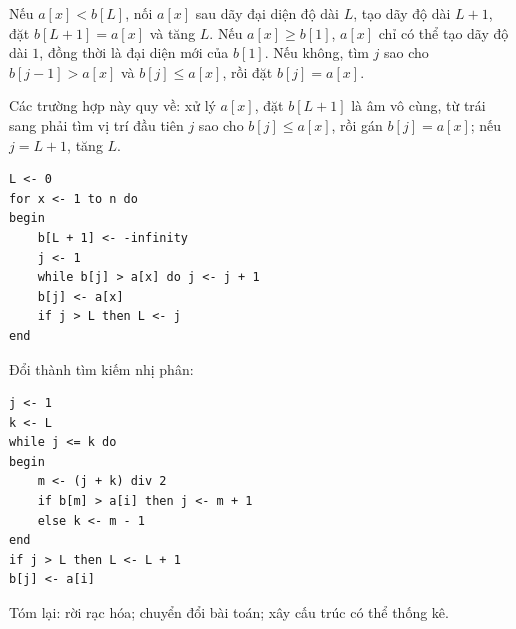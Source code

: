 \documentclass[11pt]{article}
\begin{document}
Nếu \(a[x]<b[L]\), nối \(a[x]\) sau dãy đại diện độ dài \(L\), tạo dãy độ dài
\(L+1\), đặt \(b[L+1]=a[x]\) và tăng \(L\). Nếu \(a[x]\ge b[1]\), \(a[x]\) chỉ
có thể tạo dãy độ dài \(1\), đồng thời là đại diện mới của \(b[1]\). Nếu không,
tìm \(j\) sao cho \(b[j-1]>a[x]\) và \(b[j]\le a[x]\), rồi đặt \(b[j]=a[x]\).

Các trường hợp này quy về: xử lý \(a[x]\), đặt \(b[L+1]\) là âm vô cùng, từ
trái sang phải tìm vị trí đầu tiên \(j\) sao cho \(b[j]\le a[x]\), rồi gán
\(b[j]=a[x]\); nếu \(j=L+1\), tăng \(L\).

\begin{verbatim}
L <- 0
for x <- 1 to n do
begin
    b[L + 1] <- -infinity
    j <- 1
    while b[j] > a[x] do j <- j + 1
    b[j] <- a[x]
    if j > L then L <- j
end
\end{verbatim}

Đổi thành tìm kiếm nhị phân:

\begin{verbatim}
j <- 1
k <- L
while j <= k do
begin
    m <- (j + k) div 2
    if b[m] > a[i] then j <- m + 1
    else k <- m - 1
end
if j > L then L <- L + 1
b[j] <- a[i]
\end{verbatim}

Tóm lại: rời rạc hóa; chuyển đổi bài toán; xây cấu trúc có thể thống kê.
\end{document}
